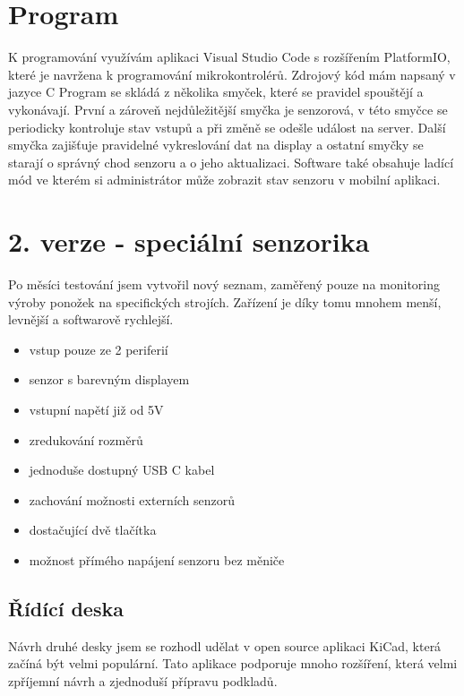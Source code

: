 \section{Program}
K programování využívám aplikaci Visual Studio Code s rozšířením PlatformIO, které je navržena k programování mikrokontrolérů. 
Zdrojový kód mám napsaný v jazyce C 
Program se skládá z několika smyček, které se pravidel spouštějí a vykonávají.
První a zároveň nejdůležitější smyčka je senzorová, v této smyčce se periodicky kontroluje stav vstupů a při změně se odešle událost na server.
Další smyčka zajišťuje pravidelné vykreslování dat na display a ostatní smyčky se starají o správný chod senzoru a o jeho aktualizaci.
Software také obsahuje ladící mód ve kterém si administrátor může zobrazit stav senzoru v mobilní aplikaci. 


\fxnote[author=JA]{\textcolor{mygreen}{Obrázek deksa => krabička}}

\newpage

\section{2. verze - speciální senzorika}

Po měsíci testování jsem vytvořil nový seznam, zaměřený pouze na monitoring výroby ponožek na specifických strojích.
Zařízení je díky tomu mnohem menší, levnější a softwarově rychlejší.

\begin{itemize}
    \item vstup pouze ze 2 periferií
    \item senzor s barevným displayem
    \item vstupní napětí již od 5V
    \item zredukování rozměrů
    \item jednoduše dostupný USB C kabel
    \item zachování možnosti externích senzorů
    \item dostačující dvě tlačítka
    \item možnost přímého napájení senzoru bez měniče
\end{itemize}

\subsection{Řídící deska}
Návrh druhé desky jsem se rozhodl udělat v open source aplikaci KiCad, která začíná být velmi populární. 
Tato aplikace podporuje mnoho rozšíření, která velmi zpříjemní návrh a zjednoduší přípravu podkladů.

